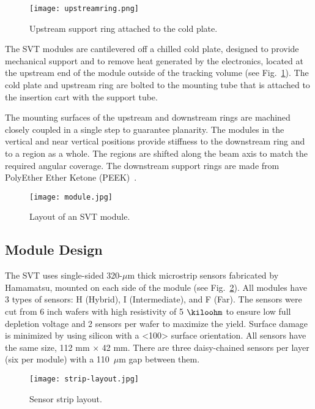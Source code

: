 \begin{figure}[hbt] 
\centering 
\texttt{[image: upstreamring.png]}
\caption{Upstream support ring attached to the cold plate.}
\label{fig:upstreamring}
\end{figure}

 The SVT modules are cantilevered off a chilled cold plate, designed to provide mechanical support and to remove heat generated by the electronics, located at the upstream end of the module outside of the tracking volume (see Fig.~\ref{fig:upstreamring}). The cold plate and upstream ring are bolted to the mounting tube that is attached to the insertion cart with the support tube. 
 
The mounting surfaces of the upstream and downstream rings are machined closely coupled in a single step to guarantee planarity. The modules in the vertical and near vertical positions provide stiffness to the downstream ring and to a region as a whole. The regions are shifted along the beam axis to match the required angular coverage. The downstream support rings are made from PolyEther Ether Ketone (PEEK)~\cite{NIMVCC}. 

\begin{figure}[hbt] 
\centering 
\texttt{[image: module.jpg]}
\caption{Layout of an SVT module.}
\label{fig:module}
\end{figure}

\subsection{Module Design}

The SVT uses single-sided 320-$\mu$m thick microstrip sensors fabricated by Hamamatsu, mounted on each side of the module (see Fig.~\ref{fig:module}). All modules have 3 types of sensors: H (Hybrid), I (Intermediate), and F (Far). The sensors were cut from 6 inch wafers with high resistivity of 5 $\kiloohm$ to ensure low full depletion voltage and 2 sensors per wafer to maximize the yield. Surface damage is minimized by using silicon with a <100> surface orientation. All sensors have the same size, 112 mm $\times$ 42 mm. There are three daisy-chained sensors per layer (six per module) with a 110~$\mu$m gap between them. 

\begin{figure}[hbt] 
\centering 
\texttt{[image: strip-layout.jpg]}
\caption{Sensor strip layout.}
\label{fig:strip-layout}
\end{figure}

